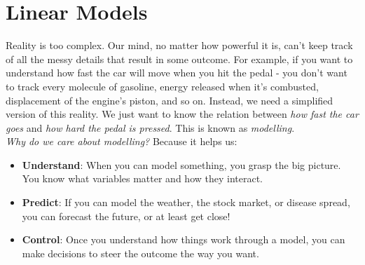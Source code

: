 \chapter{Linear Models}

Reality is too complex. Our mind, no matter how powerful it is, can't keep track of all the messy details that result in some outcome. For example, if you want to understand how fast the car will move when you hit the pedal - you don't want to track every molecule of gasoline, energy released when it's combusted, displacement of the engine's piston, and so on. Instead, we need a simplified version of this reality. We just want to know the relation between \textit{how fast the car goes} and \textit{how hard the pedal is pressed}. This is known as \textit{modelling}.\\

\textit{Why do we care about modelling?} Because it helps us: 

\begin{itemize}
    \item \textbf{Understand}: When you can model something, you grasp the big picture. You know what variables matter and how they interact.
    \item \textbf{Predict}: If you can model the weather, the stock market, or disease spread, you can forecast the future, or at least get close!
    \item \textbf{Control}: Once you understand how things work through a model, you can make decisions to steer the outcome the way you want.
\end{itemize}


